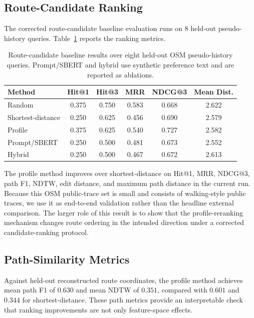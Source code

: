 \subsection{Route-Candidate Ranking}
The corrected route-candidate baseline evaluation runs on $8$ held-out pseudo-history queries. Table~\ref{tab:route_candidate_results} reports the ranking metrics.

\begin{table}[t]
  \centering
  \caption{Route-candidate baseline results over eight held-out OSM pseudo-history queries. Prompt/SBERT and hybrid use synthetic preference text and are reported as ablations.}
  \label{tab:route_candidate_results}
  \begin{tabular}{lccccc}
    \toprule
    Method & Hit@1 & Hit@3 & MRR & NDCG@3 & Mean Dist. \\
    \midrule
    Random & 0.375 & 0.750 & 0.583 & 0.668 & 2.622 \\
    Shortest-distance & 0.250 & 0.625 & 0.456 & 0.690 & 2.579 \\
    Profile & 0.375 & 0.625 & 0.540 & 0.727 & 2.582 \\
    Prompt/SBERT & 0.250 & 0.500 & 0.481 & 0.673 & 2.552 \\
    Hybrid & 0.250 & 0.500 & 0.467 & 0.672 & 2.613 \\
    \bottomrule
  \end{tabular}
\end{table}

The profile method improves over shortest-distance on Hit@1, MRR, NDCG@3, path F1, NDTW, edit distance, and maximum path distance in the current run. Because this OSM public-trace set is small and consists of walking-style public traces, we use it as end-to-end validation rather than the headline external comparison. The larger role of this result is to show that the profile-reranking mechanism changes route ordering in the intended direction under a corrected candidate-ranking protocol.

\subsection{Path-Similarity Metrics}
Against held-out reconstructed route coordinates, the profile method achieves mean path F1 of $0.630$ and mean NDTW of $0.351$, compared with $0.601$ and $0.344$ for shortest-distance. These path metrics provide an interpretable check that ranking improvements are not only feature-space effects.

